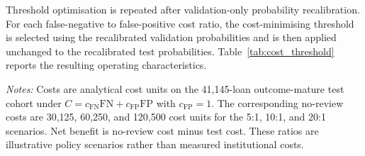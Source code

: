 \documentclass[10pt]{article}
\begin{document}
Threshold optimisation is repeated after validation-only probability recalibration. For each false-negative to false-positive cost ratio, the cost-minimising threshold is selected using the recalibrated validation probabilities and is then applied unchanged to the recalibrated test probabilities. Table~\ref{tab:cost_threshold} reports the resulting operating characteristics.

\begin{table}[!ht]
\centering
\caption{Cost-sensitive threshold selection after validation-only recalibration. Thresholds are selected on recalibrated validation probabilities and applied unchanged to the outcome-mature test cohort.}
\label{tab:cost_threshold}

\vspace{3pt}
{\footnotesize \textit{Notes:} Costs are analytical cost units on the 41,145-loan outcome-mature test cohort under $C=c_{\mathrm{FN}}\mathrm{FN}+c_{\mathrm{FP}}\mathrm{FP}$ with $c_{\mathrm{FP}}=1$. The corresponding no-review costs are 30,125, 60,250, and 120,500 cost units for the 5:1, 10:1, and 20:1 scenarios. Net benefit is no-review cost minus test cost. These ratios are illustrative policy scenarios rather than measured institutional costs.}
\end{table}
\end{document}
